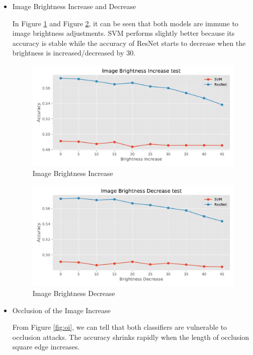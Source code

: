 \documentclass{article}
\begin{document}
\begin{itemize}
    \item Image Brightness Increase and Decrease
    
    In Figure \ref{fig:ibi} and Figure \ref{fig:ibd}, it can be seen that both models are immune to image brightness adjustments. SVM performs slightly better because its accuracy is stable while the accuracy of ResNet starts to decrease when the brightness is increased/decreased by 30.
    
    \begin{figure}[H]
    \centering
    \includegraphics[width=\columnwidth]{figures/Image_Brightness_Increase.pdf}
    \caption{Image Brightness Increase}
    \label{fig:ibi}
    \end{figure}
    
    
    \begin{figure}[H]
    \centering
    \includegraphics[width=\columnwidth]{figures/Image_Brightness_Decrease.pdf}
    \caption{Image Brightness Decrease}
    \label{fig:ibd}
    \end{figure}    

    \item Occlusion of the Image Increase
    
    From Figure \ref{fig:oi}, we can tell that both classifiers are vulnerable to occlusion attacks. The accuracy shrinks rapidly when the length of occlusion square edge increases.
    

\end{itemize}
\end{document}
